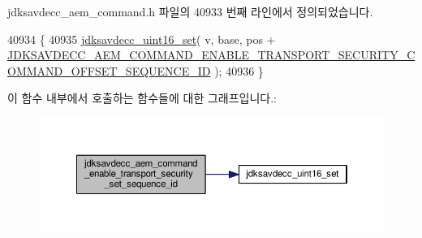 jdksavdecc\+\_\+aem\+\_\+command.\+h 파일의 40933 번째 라인에서 정의되었습니다.


\begin{DoxyCode}
40934 \{
40935     \hyperlink{group__endian_ga14b9eeadc05f94334096c127c955a60b}{jdksavdecc\_uint16\_set}( v, base, pos + 
      \hyperlink{group__command__enable__transport__security_ga7d968d5fde7123ae86f986c643bb3d23}{JDKSAVDECC\_AEM\_COMMAND\_ENABLE\_TRANSPORT\_SECURITY\_COMMAND\_OFFSET\_SEQUENCE\_ID}
       );
40936 \}
\end{DoxyCode}


이 함수 내부에서 호출하는 함수들에 대한 그래프입니다.\+:
\nopagebreak
\begin{figure}[H]
\begin{center}
\leavevmode
\includegraphics[width=350pt]{group__command__enable__transport__security_gac89ec6944da321a46a35bb7e150038f3_cgraph}
\end{center}
\end{figure}


